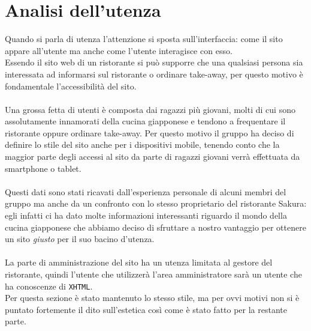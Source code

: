 \documentclass[../relazione.tex]{subfiles}
\begin{document}
\section{Analisi dell'utenza}
		Quando si parla di utenza l'attenzione si sposta sull'interfaccia: come il sito appare all'utente ma anche come l'utente interagisce con esso.\\
		Essendo il sito web di un ristorante si può supporre che una qualsiasi persona sia interessata ad informarsi sul ristorante o ordinare take-away, per questo motivo è fondamentale l'accessibilità del sito.\\\\
		Una grossa fetta di utenti è composta dai ragazzi più giovani, molti di cui sono assolutamente innamorati della cucina giapponese e tendono a frequentare il ristorante oppure ordinare take-away.
		Per questo motivo il gruppo ha deciso di definire lo stile del sito anche per i dispositivi mobile, tenendo conto che la maggior parte degli accessi al sito da parte di ragazzi giovani verrà effettuata da smartphone o tablet.\\\\
		Questi dati sono stati ricavati dall'esperienza personale di alcuni membri del gruppo ma anche da un confronto con lo stesso proprietario del ristorante Sakura: egli infatti ci ha dato molte informazioni interessanti riguardo il mondo della cucina giapponese che abbiamo deciso di sfruttare a nostro vantaggio per ottenere un sito \textit{giusto} per il suo bacino d'utenza.\\\\
		La parte di amministrazione del sito ha un utenza limitata al gestore del ristorante, quindi l'utente che utilizzerà l'area amministratore sarà un utente che ha conoscenze di \texttt{XHTML}.\\
		Per questa sezione è stato mantenuto lo stesso stile, ma per ovvi motivi non si è puntato fortemente il dito sull'estetica così come è stato fatto per la restante parte. 
\end{document}
